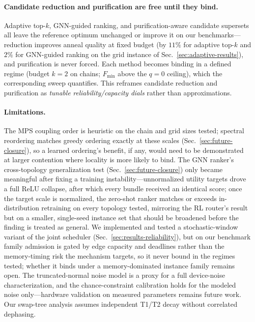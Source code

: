 \documentclass[twocolumn]{article}
\begin{document}
\paragraph{Candidate reduction and purification are free until they
bind.}  Adaptive top-$k$, GNN-guided ranking, and purification-aware
candidate supersets all leave the reference optimum unchanged or
improve it on our benchmarks---reduction improves anneal quality at
fixed budget (by $11\%$ for adaptive top-$k$ and $2\%$ for GNN-guided
ranking on the grid instance of Sec.~\ref{sec:adaptive-results}), and
purification is never forced.  Each method becomes binding in a
defined regime (budget $k=2$ on chains; $F_{\min}$ above the $q{=}0$
ceiling), which the corresponding sweep quantifies.  This reframes
candidate reduction and purification as \emph{tunable
reliability/capacity dials} rather than approximations.

\paragraph{Limitations.}  The MPS coupling order is heuristic on the
chain and grid sizes tested; spectral reordering matches greedy
ordering exactly at these scales (Sec.~\ref{sec:future-closure}), so a
learned ordering's benefit, if any, would need to be demonstrated at
larger contention where locality is more likely to bind.  The GNN
ranker's cross-topology generalization test (Sec.~\ref{sec:future-closure})
only became meaningful after fixing a training instability---unnormalized
utility targets drove a full ReLU collapse, after which every bundle
received an identical score; once the target scale is normalized, the
zero-shot ranker matches or exceeds in-distribution retraining on
every topology tested, mirroring the RL router's result but on a
smaller, single-seed instance set that should be broadened before the
finding is treated as general.  We implemented and tested a
stochastic-window variant of the joint scheduler
(Sec.~\ref{sec:results-reliability}), but on our benchmark family
admission is gated by edge capacity and deadlines rather than the
memory-timing risk the mechanism targets, so it never bound in the
regimes tested; whether it binds under a memory-dominated instance
family remains open.  The truncated-normal noise model is a proxy for
a full device-noise
characterization, and the chance-constraint calibration holds for the
modeled noise only---hardware validation on measured parameters
remains future work.  Our swap-tree analysis assumes independent T1/T2
decay without correlated dephasing.
\end{document}
